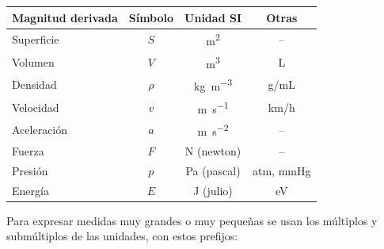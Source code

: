 \begin{center}
{    }
    \quad
    {\small
    \begin{tabular}{@{}lccc@{}}
        \toprule
        \textbf{Magnitud derivada} & \textbf{Símbolo} & \textbf{Unidad SI} & \textbf{Otras} \\
        \midrule
        Superficie & \(S\) & \unit{\square\m} & -- \\[3pt]
        Volumen & \(V\) & \unit{\cubic\m} & L \\[3pt]
        Densidad & \(\rho\) & \unit{\kg\per\cubic\m} & g/mL \\[3pt]
        Velocidad & \(v\) & \unit{\m\per\s} & km/h \\[3pt]
        Aceleración & \(a\) & \unit{\m\per\square\s} & -- \\[3pt]
        Fuerza & \(F\) & N (newton) & -- \\[3pt]
        Presión & \(p\) & Pa (pascal) & atm, mmHg \\[3pt]
        Energía & \(E\) & J (julio) & eV \\
        \bottomrule
    \end{tabular}
    }
\end{center}

Para expresar medidas muy grandes o muy pequeñas se usan los múltiplos y submúltiplos de las unidades, con estos prefijos:

